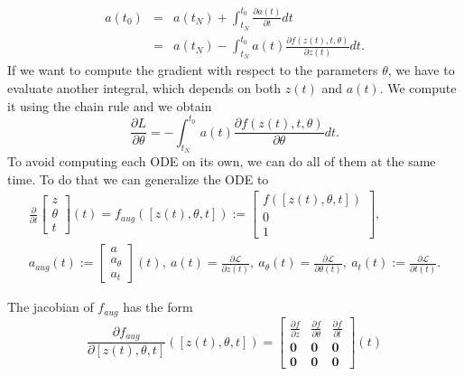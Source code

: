 \documentclass[10pt,a4paper]{article}
\theoremstyle{definition}
\theoremstyle{plain}
\begin{document}
\begin{eqnarray*}
a(t_0) &=& a(t_N) + \int^{t_0}_{t_N} \frac{\partial a(t)}{\partial t} dt\\
	   &=& a(t_N) - \int^{t_0}_{t_N} a(t) \frac{\partial f(z(t),t,\theta)} {\partial z(t)} dt.
\end{eqnarray*}
If we want to compute the gradient with respect to the parameters $\theta$, we have to evaluate another integral, which depends on both $z(t)$ and $a(t)$. We compute it using the chain rule and we obtain
\begin{equation}
\label{devtheta}
\frac{\partial L}{\partial \theta} = - \int^{t_0}_{t_N} a(t) \frac{\partial f(z(t),t,\theta)} {\partial \theta} dt.
\end{equation}
To avoid computing each ODE on its own, we can do all of them at the same time. To do that we can generalize the ODE to
\begin{eqnarray*}
\frac{\partial}{\partial t} \begin{bmatrix}
							z \\ \theta \\ t
							\end{bmatrix} (t) 
= f_{aug}([z(t),\theta ,t]) := \begin{bmatrix}
							f([z(t),\theta ,t]) \\ 0 \\ 1
							\end{bmatrix}, \\
a_{aug} (t) := \begin{bmatrix}
			a \\ a_{\theta} \\ a_t
			\end{bmatrix} (t) , \ 
a(t) = \frac{\partial \mathcal{L}}{\partial z(t)}, \ 
a_\theta (t) = \frac{\partial \mathcal{L}}{\partial \theta (t)}, \ 
a_t(t) := \frac{\partial \mathcal{L}}{\partial t(t)}.
\end{eqnarray*}

The jacobian of $f_{aug}$ has the form
\begin{equation*}
\frac{\partial f_{aug}}{\partial [z(t),\theta,t]}([z(t),\theta,t]) = \begin{bmatrix}
\frac{\partial f}{\partial z} & \frac{\partial f}{\partial \theta} & \frac{\partial f}{\partial t} \\
\textbf{0} & \textbf{0} & \textbf{0} \\
\textbf{0} & \textbf{0} & \textbf{0}
\end{bmatrix}(t)
\end{equation*}
\end{document}
